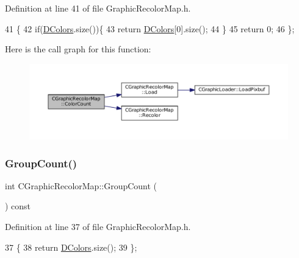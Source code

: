 Definition at line 41 of file Graphic\+Recolor\+Map.\+h.


\begin{DoxyCode}
41                               \{
42             \textcolor{keywordflow}{if}(\hyperlink{classCGraphicRecolorMap_a9dea9a9e96e4465a53a40c4a34cebf71}{DColors}.size())\{
43                 \textcolor{keywordflow}{return} \hyperlink{classCGraphicRecolorMap_a9dea9a9e96e4465a53a40c4a34cebf71}{DColors}[0].size();    
44             \}
45             \textcolor{keywordflow}{return} 0;
46         \};
\end{DoxyCode}
Here is the call graph for this function\+:\nopagebreak
\begin{figure}[H]
\begin{center}
\leavevmode
\includegraphics[width=350pt]{classCGraphicRecolorMap_a62215bd2082304dc710d0f63af9c9906_cgraph}
\end{center}
\end{figure}
\hypertarget{classCGraphicRecolorMap_a326b3f7b5ba379e2ccc07ffeb1eb69ca}{}\label{classCGraphicRecolorMap_a326b3f7b5ba379e2ccc07ffeb1eb69ca} 
\subsubsection{\texorpdfstring{Group\+Count()}{GroupCount()}}
{\footnotesize\ttfamily int C\+Graphic\+Recolor\+Map\+::\+Group\+Count (\begin{DoxyParamCaption}{ }\end{DoxyParamCaption}) const\hspace{0.3cm}{\ttfamily [inline]}}



Definition at line 37 of file Graphic\+Recolor\+Map.\+h.


\begin{DoxyCode}
37                               \{
38             \textcolor{keywordflow}{return} \hyperlink{classCGraphicRecolorMap_a9dea9a9e96e4465a53a40c4a34cebf71}{DColors}.size();
39         \};
\end{DoxyCode}
\hypertarget{classCGraphicRecolorMap_a71b26547c2e943036278611d048afdfb}{}\label{classCGraphicRecolorMap_a71b26547c2e943036278611d048afdfb} 
